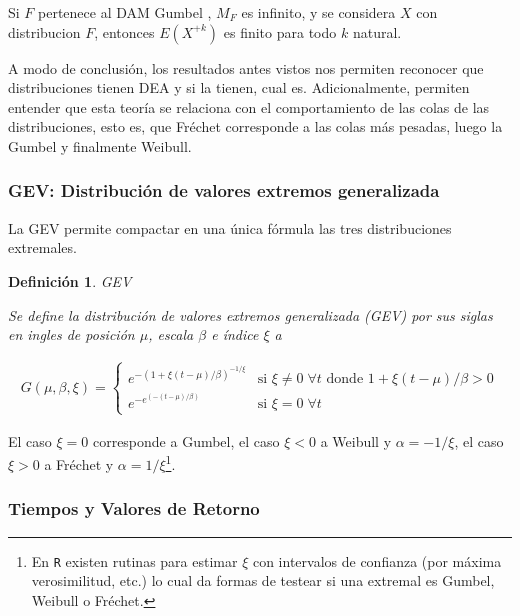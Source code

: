 \documentclass[
  12pt]{article}
\newtheorem{definition}{Definición}[section]
\begin{document}
\begin{Corolario}
Si $F$ pertenece al DAM Gumbel , $M_F$ es infinito, y se considera $X$ con distribucion $F$, entonces $E(X^{+k})$ es finito para todo $k$ natural.
\end{Corolario}

A modo de conclusión, los resultados antes vistos nos permiten reconocer
que distribuciones tienen DEA y si la tienen, cual es. Adicionalmente,
permiten entender que esta teoría se relaciona con el comportamiento de
las colas de las distribuciones, esto es, que Fréchet corresponde a las
colas más pesadas, luego la Gumbel y finalmente Weibull.

\newpage

\subsubsection*{GEV: Distribución de valores extremos generalizada}

La GEV permite compactar en una única fórmula las tres distribuciones
extremales.

\begin{definition} GEV

Se define la distribución de valores extremos generalizada (GEV) por sus siglas en ingles de posición $\mu$, escala $\beta$ e índice $\xi$ a

\begin{align*}
G(\mu, \beta, \xi) = \begin{cases}
e^{ -\left ( 1+\xi(t-\mu)/\beta \right )^{-1/\xi} } & \text{si } \xi\neq 0\; \forall t \text{ donde } 1+\xi(t-\mu)/\beta>0\\ 
e^{ -e^{\left ( -(t-\mu)/\beta \right )}} & \text{si } \xi=0 \; \forall t
\end{cases}
\end{align*}
\end{definition}

El caso \(\xi=0\) corresponde a Gumbel, el caso \(\xi<0\) a Weibull y
\(\alpha=-1/ \xi\), el caso \(\xi>0\) a Fréchet y
\(\alpha=1/ \xi\)\footnote{En \texttt{R} existen rutinas para estimar $\xi$ con intervalos de confianza (por máxima verosimilitud, etc.) lo cual da formas de testear si una extremal es Gumbel, Weibull o Fréchet.}.

\subsubsection*{Tiempos y Valores de Retorno}
\end{document}
